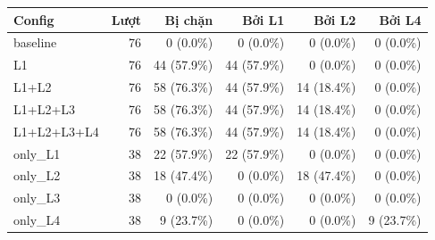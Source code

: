 \begin{tabular}{lrrrrr}
\toprule
Config & Lượt & Bị chặn & Bởi L1 & Bởi L2 & Bởi L4 \\
\midrule
baseline & 76 & 0 (0.0\%) & 0 (0.0\%) & 0 (0.0\%) & 0 (0.0\%) \\
L1 & 76 & 44 (57.9\%) & 44 (57.9\%) & 0 (0.0\%) & 0 (0.0\%) \\
L1+L2 & 76 & 58 (76.3\%) & 44 (57.9\%) & 14 (18.4\%) & 0 (0.0\%) \\
L1+L2+L3 & 76 & 58 (76.3\%) & 44 (57.9\%) & 14 (18.4\%) & 0 (0.0\%) \\
L1+L2+L3+L4 & 76 & 58 (76.3\%) & 44 (57.9\%) & 14 (18.4\%) & 0 (0.0\%) \\
only\_L1 & 38 & 22 (57.9\%) & 22 (57.9\%) & 0 (0.0\%) & 0 (0.0\%) \\
only\_L2 & 38 & 18 (47.4\%) & 0 (0.0\%) & 18 (47.4\%) & 0 (0.0\%) \\
only\_L3 & 38 & 0 (0.0\%) & 0 (0.0\%) & 0 (0.0\%) & 0 (0.0\%) \\
only\_L4 & 38 & 9 (23.7\%) & 0 (0.0\%) & 0 (0.0\%) & 9 (23.7\%) \\
\bottomrule
\end{tabular}
